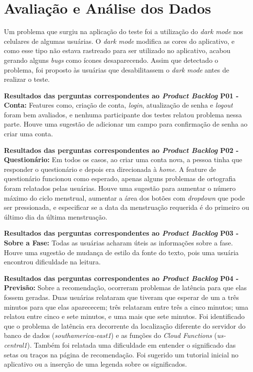 \section{Avaliação e Análise dos Dados}



Um problema que surgiu na aplicação do teste foi a utilização do \emph{dark mode} nos celulares de algumas usuárias. O \emph{dark mode} 
modifica as cores do aplicativo, e como esse tipo não estava rastreado para ser utilizado no aplicativo, acabou gerando alguns \emph{bugs} 
como ícones desaparecendo. Assim que detectado o problema, foi proposto às usuárias que desabilitassem o \emph{dark mode} antes de realizar o teste.

\textbf{Resultados das perguntas correspondentes ao \emph{Product Backlog} P01 - Conta:} Features como, criação de conta, \emph{login}, atualização de 
senha e \emph{logout} foram bem avaliados, e nenhuma participante dos testes relatou problema nessa parte. 
Houve uma sugestão de adicionar um campo para confirmação de senha ao criar uma conta.


\textbf{Resultados das perguntas correspondentes ao \emph{Product Backlog} P02 - Questionário:} Em todos os casos, ao criar uma 
conta nova, a pessoa tinha que responder o 
questionário e depois era direcionada à \emph{home}. A feature de questionário 
funcionou como esperado, apenas alguns problemas de ortografia foram relatados pelas usuárias. Houve uma sugestão para aumentar o 
número máximo do ciclo menstrual, aumentar a área dos botões com \emph{dropdown} que pode ser pressionada, e especificar se a 
data da menstruação requerida é do 
primeiro ou último dia da última menstruação.

\textbf{Resultados das perguntas correspondentes ao \emph{Product Backlog} P03 - Sobre a Fase:} Todas as usuárias acharam úteis 
as informações 
sobre a fase. Houve uma sugestão de mudança de estilo da fonte do texto, pois uma usuária encontrou dificuldade na leitura.


\textbf{Resultados das perguntas correspondentes ao \emph{Product Backlog} P04 - Previsão:} Sobre a recomendação, ocorreram 
problemas de latência para que elas fossem geradas. Duas usuárias relataram que tiveram que esperar de um a três 
minutos para que elas aparececem; três relataram entre três a cinco minutos; uma relatou entre cinco e sete minutos, 
e uma mais que sete minutos. Foi identificado que o problema de latência era 
decorrente da localização diferente do servidor do banco de dados (\emph{southamerica-east1}) e as 
funções do \emph{Cloud Functions} (\emph{us-central1}). Também foi relatada 
uma dificuldade em entender o significado das setas ou traços na página de recomendação. Foi sugerido 
um tutorial inicial no aplicativo ou a inserção de uma legenda sobre os significados.

